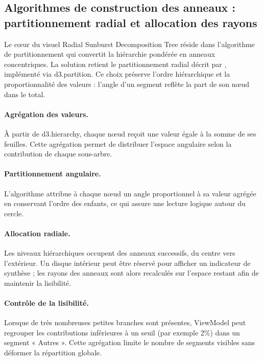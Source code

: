 \subsection{Algorithmes de construction des anneaux : partitionnement radial et allocation des rayons}
\label{subsec:4B-layout}

\setlength{\parindent}{0pt}

Le cœur du visuel Radial Sunburst Decomposition Tree  réside dans l’algorithme de partitionnement qui convertit la hiérarchie pondérée en anneaux concentriques. La solution retient le partitionnement radial décrit par \parencite{stasko2000}, implémenté via d3.partition. Ce choix préserve l’ordre hiérarchique et la proportionnalité des valeurs : l’angle d’un segment reflète la part de son nœud dans le total.

\paragraph{Agrégation des valeurs.} À partir de d3.hierarchy, chaque nœud reçoit une valeur égale à la somme de ses feuilles. Cette agrégation permet de distribuer l’espace angulaire selon la contribution de chaque sous-arbre.

\paragraph{Partitionnement angulaire.} L’algorithme attribue à chaque nœud un angle proportionnel à sa valeur agrégée en conservant l’ordre des enfants, ce qui assure une lecture logique autour du cercle.

\paragraph{Allocation radiale.} Les niveaux hiérarchiques occupent des anneaux successifs, du centre vers l’extérieur. Un disque intérieur peut être réservé pour afficher un indicateur de synthèse ; les rayons des anneaux sont alors recalculés sur l’espace restant afin de maintenir la lisibilité.

\paragraph{Contrôle de la lisibilité.} Lorsque de très nombreuses petites branches sont présentes, ViewModel peut regrouper les contributions inférieures à un seuil (par exemple 2\%) dans un segment « Autres ». Cette agrégation limite le nombre de segments visibles sans déformer la répartition globale.

